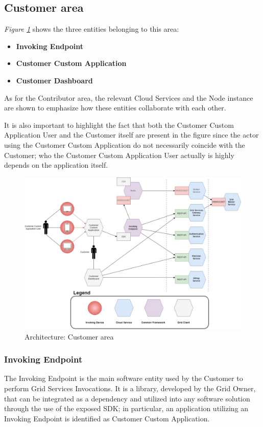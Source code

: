 \subsection{Customer area}\label{customer_area}
\textit{Figure \ref{fig:architecture_customer}} shows the three entities belonging to this area:
\begin{itemize}
    \item \textbf{Invoking Endpoint}
    \item \textbf{Customer Custom Application}
    \item \textbf{Customer Dashboard}
\end{itemize}
As for the Contributor area, the relevant Cloud Services and the Node instance are shown to emphasize how these entities collaborate with each other.

It is also important to highlight the fact that both the Customer Custom Application User and the Customer itself are present in the figure since the actor using the Customer Custom Application do not necessarily coincide with the Customer; who the Customer Custom Application User actually is highly depends on the application itself.
\vspace{8mm}

\begin{figure}[!ht]
    \centering
    \includegraphics[width=\linewidth]{document/chapters/chapter_6/images/architecture_customer.jpg}
    \caption{Architecture: Customer area}
    \label{fig:architecture_customer}
\end{figure}

\subsubsection{Invoking Endpoint}
The Invoking Endpoint is the main software entity used by the Customer to perform Grid Services Invocations. It is a library, developed by the Grid Owner, that can be integrated as a dependency and utilized into any software solution through the use of the exposed SDK; in particular, an application utilizing an Invoking Endpoint is identified as Customer Custom Application.

